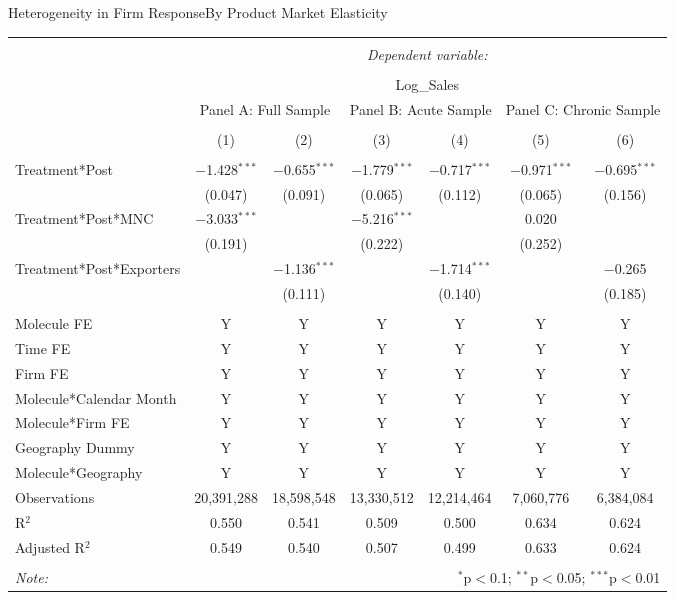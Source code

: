 \documentclass[aspectratio=43]{beamer}
\begin{document}
\begin{frame}[label= FirmHetero]{Heterogeneity in Firm Response}{By Product Market Elasticity}
	\begin{table}[h!] \centering
		\label{Table-R-3} 
		\tiny
		\begin{tabular}{@{\extracolsep{-10pt}}lcccccc} 
			\\[-1.8ex]\hline 
			\hline \\[-1.8ex] 
			& \multicolumn{6}{c}{\textit{Dependent variable:}} \\ 
			\cline{2-7} 
			\\[-1.8ex] & \multicolumn{6}{c}{Log\_Sales} \\ 
			& \multicolumn{2}{c}{Panel A: Full Sample} & \multicolumn{2}{c}{Panel B: Acute Sample} & \multicolumn{2}{c}{Panel C: Chronic Sample} \\ 
			\\[-1.8ex] & (1) & (2) & (3) & (4) & (5) & (6)\\ 
			\hline \\[-1.8ex] 
			Treatment*Post & $-$1.428$^{***}$ & $-$0.655$^{***}$ & $-$1.779$^{***}$ & $-$0.717$^{***}$ & $-$0.971$^{***}$ & $-$0.695$^{***}$ \\ 
			& (0.047) & (0.091) & (0.065) & (0.112) & (0.065) & (0.156) \\ 
			Treatment*Post*MNC & $-$3.033$^{***}$ &  & $-$5.216$^{***}$ &  & 0.020 &  \\ 
			& (0.191) &  & (0.222) &  & (0.252) &  \\ 
			Treatment*Post*Exporters &  & $-$1.136$^{***}$ &  & $-$1.714$^{***}$ &  & $-$0.265 \\ 
			&  & (0.111) &  & (0.140) &  & (0.185) \\ 
			\hline \\[-1.8ex] 
			Molecule FE & Y & Y & Y & Y & Y & Y \\ 
			Time FE & Y & Y & Y & Y & Y & Y \\ 
			Firm FE & Y & Y & Y & Y & Y & Y \\ 
			Molecule*Calendar Month & Y & Y & Y & Y & Y & Y \\ 
			Molecule*Firm FE & Y & Y & Y & Y & Y & Y \\ 
			Geography Dummy & Y & Y & Y & Y & Y & Y \\ 
			Molecule*Geography & Y & Y & Y & Y & Y & Y \\ 
			Observations & 20,391,288 & 18,598,548 & 13,330,512 & 12,214,464 & 7,060,776 & 6,384,084 \\ 
			R$^{2}$ & 0.550 & 0.541 & 0.509 & 0.500 & 0.634 & 0.624 \\ 
			Adjusted R$^{2}$ & 0.549 & 0.540 & 0.507 & 0.499 & 0.633 & 0.624 \\ 
			\hline 
			\hline \\[-1.8ex] 
			\textit{Note:}  & \multicolumn{6}{r}{$^{*}$p$<$0.1; $^{**}$p$<$0.05; $^{***}$p$<$0.01} \\ 
		\end{tabular} 
	\end{table} 
\end{frame}
\end{document}
